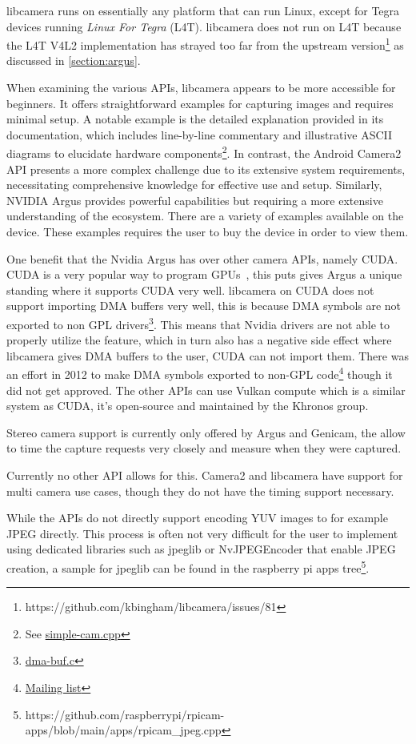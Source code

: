 libcamera runs on essentially any platform that can run Linux, except for
Tegra devices running \textit{Linux For Tegra} (L4T). libcamera does not run
on L4T because the L4T V4L2 implementation has strayed too far from the
upstream version\footnote{https://github.com/kbingham/libcamera/issues/81} as
discussed in \cref{section:argus}.

When examining the various APIs, libcamera appears to be more accessible for
beginners. It offers straightforward examples for capturing images and requires
minimal setup. A notable example is the detailed explanation provided in its
documentation, which includes line-by-line commentary and illustrative ASCII
diagrams to elucidate hardware components\footnote{See \href{https://github.com/kbingham/simple-cam/blob/master/simple-cam.cpp}{simple-cam.cpp}}.
In contrast, the Android Camera2 API presents a more complex challenge due to
its extensive system requirements, necessitating comprehensive knowledge for
effective use and setup. Similarly, NVIDIA Argus provides powerful capabilities but
requiring a more extensive understanding of the ecosystem. There are a variety
of examples available on the device. These examples requires the user to buy
the device in order to view them.

One benefit that the Nvidia Argus has over other camera APIs, namely CUDA.
CUDA is a very popular way to program GPUs~\cite{kalaiselvi2017survey}, this
puts gives Argus a unique standing where it supports CUDA very well. libcamera
on CUDA does not support importing DMA buffers very well, this is because DMA
symbols are not exported to non GPL drivers\footnote{\href{https://github.com/torvalds/linux/blob/master/drivers/dma-buf/dma-buf.c}{dma-buf.c}}.
This means that Nvidia drivers are not able to properly utilize the feature,
which in turn also has a negative side effect where libcamera gives DMA buffers
to the user, CUDA can not import them. There was an effort in 2012 to make DMA
symbols exported to non-GPL code\footnote{\href{https://patchwork.kernel.org/project/dri-devel/patch/1349884592-32485-1-git-send-email-rmorell@nvidia.com/}{Mailing list}}
though it did not get approved. The other APIs can use Vulkan compute which is
a similar system as CUDA, it's open-source and maintained by the Khronos group.

Stereo camera support is currently only offered by Argus and Genicam, the allow
to time the capture requests very closely and measure when they were captured.

Currently no other API allows for this. Camera2 and libcamera have support for
multi camera use cases, though they do not have the timing support necessary.

While the APIs do not directly support encoding YUV images to for example JPEG directly.
This process is often not very difficult for the user to implement using
dedicated libraries such as jpeglib or NvJPEGEncoder that enable JPEG creation,
a sample for jpeglib can be found in the raspberry pi apps tree\footnote{https://github.com/raspberrypi/rpicam-apps/blob/main/apps/rpicam\_jpeg.cpp}.


